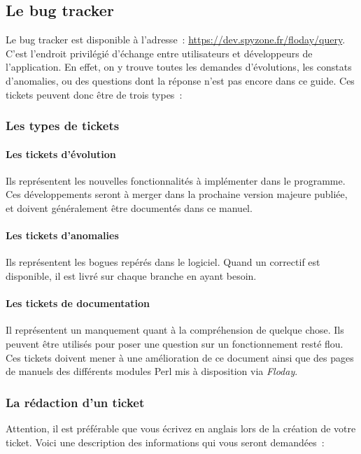 \subsection{Le bug tracker}
\label{sec:contribution_bt}

Le bug tracker est disponible à l'adresse~: \url{https://dev.spyzone.fr/floday/query}.
C'est l'endroit privilégié d'échange entre utilisateurs et développeurs de l'application.
En effet, on y trouve toutes les demandes d'évolutions, les constats d'anomalies, ou des questions dont la réponse n'est pas encore dans ce guide.
Ces tickets peuvent donc être de trois types~:

\subsubsection{Les types de tickets}
\paragraph{Les tickets d'évolution} Ils représentent les nouvelles fonctionnalités à implémenter dans le programme. Ces développements seront à merger dans la prochaine version majeure publiée, et doivent généralement être documentés dans ce manuel.
\paragraph{Les tickets d'anomalies} Ils représentent les bogues repérés dans le logiciel. Quand un correctif est disponible, il est livré sur chaque branche en ayant besoin.
\paragraph{Les tickets de documentation} Il représentent un manquement quant à la compréhension de quelque chose. Ils peuvent être utilisés pour poser une question sur un fonctionnement resté flou.
Ces tickets doivent mener à une amélioration de ce document ainsi que des pages de manuels des différents modules Perl mis à disposition via \emph{Floday}.

\subsubsection{La rédaction d'un ticket}
Attention, il est préférable que vous écrivez en anglais lors de la création de votre ticket.
Voici une description des informations qui vous seront demandées~:
\newline

